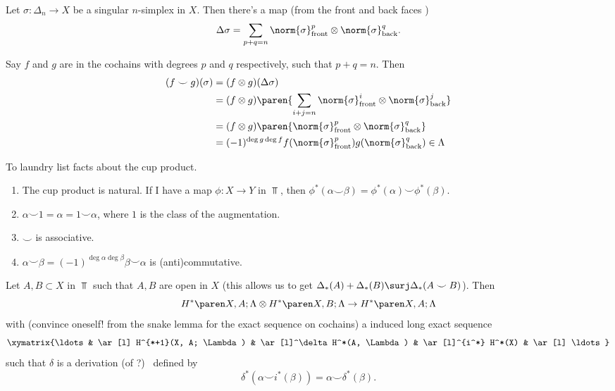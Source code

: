 \begin{defn}
    Let $\sigma \colon \Delta_n \to X$ be a singular $n$-simplex in $X$. Then there's a map (from the front and back faces \TODO)
   \[
       \Delta \sigma  = \sum_{p + q = n} \norm{ \sigma }_\text{front}^p \otimes \norm{ \sigma }_\text{back}^q
   .\]
\end{defn}

Say $f$ and $g$ are in the cochains with degrees $p$ and $q$ respectively, such that $p+q = n$. Then
\begin{align*}
    (f \smile g)(\sigma) &= (f \otimes g)(\Delta\sigma)\\
                       &= (f \otimes g) \paren{\sum_{i+j = n} \norm{ \sigma }_\text{front}^i \otimes \norm{ \sigma }_\text{back}^j} \\
                       &= (f \otimes g) \paren{ \norm{ \sigma }_\text{front}^p \otimes \norm{ \sigma }_\text{back}^q}  \\
                       & = (-1)^{\deg g \deg f} f(  \norm{ \sigma }_\text{front}^p ) g(\norm{ \sigma }_\text{back}^q) \in \Lambda
\end{align*}

To laundry list facts about the cup product.
\begin{enumerate}
    \item The cup product is natural. If I have a map $\phi \colon X \to Y$ in $\Top$, then $\phi^*(\alpha \smile \beta) = \phi^*(\alpha) \smile \phi^*(\beta)$.
    \item $\alpha \smile 1 = \alpha = 1 \smile \alpha$, where $1$ is the class of the augmentation.
    \item $\smile$ is associative.
    \item $\alpha \smile \beta = (-1)^{\deg \alpha \deg \beta} \beta \smile \alpha$ is (anti)commutative.
\end{enumerate}
 
\begin{todo}
Let $A, B  \subset X$ in $\Top$ such that $A, B$ are open in $X$ (this allows us to get $\Delta_*(A) + \Delta_*(B) \surj \Delta_*(A \smile B)$). Then
        \[
            \coho{X, A}{\Lambda} \otimes \coho{X, B}{\Lambda} \to \coho{X, A}{\Lambda}
        \]
        with (convince oneself! from the snake lemma for the exact sequence on cochains) a induced long exact sequence
        \[
            \xymatrix{\ldots & \ar[l] H^{*+1}(X, A; \Lambda) & \ar[l]^\delta H^*(A, \Lambda) & \ar[l]^{i^*} H^*(X) & \ar[l] \ldots}
        \]
        such that $\delta$ is a derivation (of ?) \TODO\  defined by 
        \[\delta^*(\alpha \smile i^*(\beta)) = \alpha \smile \delta^*(\beta).\]
\end{todo}
